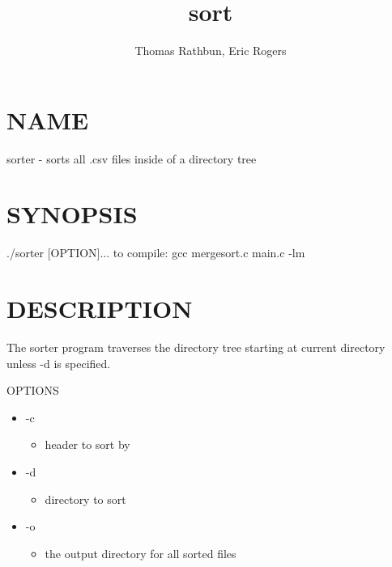 \documentclass{article}
\title{sort}
\author{Thomas Rathbun, Eric Rogers}
\date{}
\begin{document}
\begin{titlepage}
\maketitle
\end{titlepage}

\section{NAME}
\begin{center}
sorter - sorts all .csv files inside of a directory tree  
\end{center}

\section{SYNOPSIS}
\begin{center} 
./sorter [OPTION]... 
to compile: gcc mergesort.c main.c -lm 
\end{center}

\section{DESCRIPTION}
\begin{center} 
The sorter program traverses the directory tree starting at current
directory unless -d is specified.

OPTIONS
\begin{itemize}
\item -c
\begin{itemize}
\item header to sort by
\end{itemize}
\item -d
\begin{itemize}
\item directory to sort
\end{itemize}
\item -o
\begin{itemize}
\item the output directory for all sorted files
\end{itemize}
\end{itemize}
\end{center}
\end{document}
